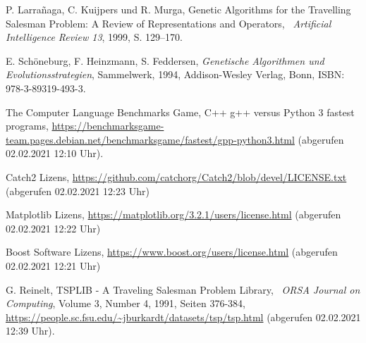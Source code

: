 
\begin{thebibliography}{99}
	P. Larrañaga, C. Kuijpers und R. Murga,
	\glqq Genetic Algorithms for the Travelling Salesman Problem: A Review of Representations and Operators,\grqq 
	\ \textit{Artificial Intelligence Review 13}, 1999, S. 129–170.

	E. Schöneburg, F. Heinzmann, S. Feddersen,
	\emph{Genetische Algorithmen und Evolutionsstrategien},
	Sammelwerk, 1994, Addison-Wesley Verlag, Bonn, ISBN: 978-3-89319-493-3.

	The Computer Language Benchmarks Game,
	C++ g++ versus Python 3 fastest programs,
	\url{https://benchmarksgame-team.pages.debian.net/benchmarksgame/fastest/gpp-python3.html} (abgerufen 02.02.2021 12:10 Uhr).

	Catch2 Lizens,
	\url{https://github.com/catchorg/Catch2/blob/devel/LICENSE.txt} (abgerufen 02.02.2021 12:23 Uhr)

	Matplotlib Lizens,
	\url{https://matplotlib.org/3.2.1/users/license.html} (abgerufen 02.02.2021 12:22 Uhr)

	Boost Software Lizens,
	\url{https://www.boost.org/users/license.html} (abgerufen 02.02.2021 12:21 Uhr)

	G. Reinelt,
	\glqq TSPLIB - A Traveling Salesman Problem Library,\grqq 
	\ \textit{ORSA Journal on Computing},
	Volume 3, Number 4, 1991, Seiten 376-384,
	\url{https://people.sc.fsu.edu/~jburkardt/datasets/tsp/tsp.html} (abgerufen 02.02.2021 12:39 Uhr).
	
	
\end{thebibliography}

